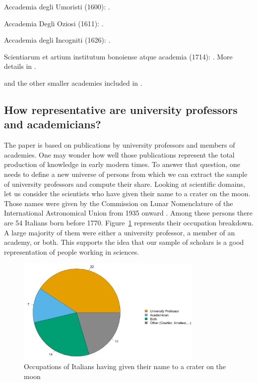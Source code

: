 Accademia degli Umoristi (1600): .

Accademia Degli Oziosi (1611): .

Accademia degli Incogniti (1626): .

Scientiarum et artium institutum bonoiense atque academia (1714): .  More details in .

and the other smaller academies included in .



\subsection{How representative are university professors and academicians?}\label{appendix:data1}

The paper is based on publications by university professors and members of academies. One may wonder
how well those publications represent the total production of knowledge in early modern times.
To answer that question, one needs to define a new universe of persons from which we can extract the sample of university professors and compute their share.
Looking at scientific domains, let us consider the scientists who have given their name to a crater on the moon. Those names were given by the Commission on
Lunar Nomenclature of the International Astronomical Union from 1935 onward \cite{richardson1945s}.
Among these persons there are 54 Italians born before 1770. Figure~\ref{fig:moon} represents their occupation breakdown.
A large majority of them were either a university professor, a member of an academy, or both. This supports the idea that our sample of scholars is a good representation of people working in sciences.


\begin{figure}[hb]
\begin{center}
\includegraphics[width=9cm]{Erudites-Italian.png}
\end{center}
\caption{Occupations of Italians having given their name to a crater on the moon} \label{fig:moon}
\end{figure}

